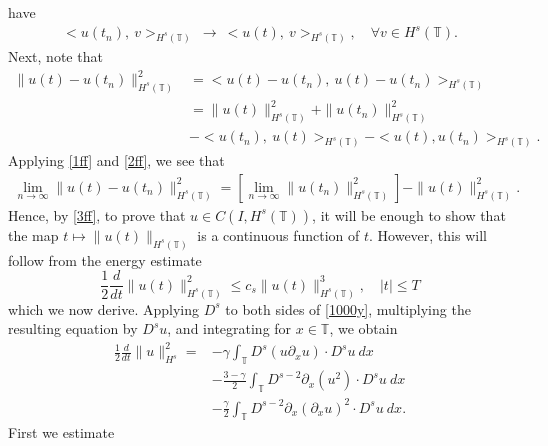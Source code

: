 \documentclass[12pt,reqno]{amsart}
\newcommand{\p}{\partial}
\newcommand{\ci}{\mathbb{T}}
\theoremstyle{plain}  %
\theoremstyle{definition}
\begin{document}
\begin{appendices}
have
\begin{equation}
	\begin{split}
		<u(t_n), \ v>_{H^s(\ci)} \ \longrightarrow \
		<u(t), \ v>_{H^s(\ci)}, \quad \forall
		v \in H^s(\ci).
		\label{1ff}
	\end{split}
\end{equation}
Next, note that
\begin{equation}
	\begin{split}
		\|u(t) - u(t_n) \|_{H^s(\ci)}^2
		& = <u(t) - u(t_n), \ u(t) -
		u(t_n)>_{H^s(\ci)}
		\\
		& = \|u(t)\|_{H^s(\ci)}^2 + \|u(t_n)\|_{H^s(\ci)}^2
		\\
		& - <u(t_n), \
		u(t) >_{H^s(\ci)} - <u(t), u(t_n)>_{H^s(\ci)}.
		\label{2ff}
	\end{split}
\end{equation}
Applying \eqref{1ff} and \eqref{2ff}, we see that
\begin{equation}
	\begin{split}
		\lim_{n \to \infty} \|u(t) - u(t_n)\|_{H^s(\ci)}^2 = \left[ \lim_{n
		\to \infty} \|u(t_n)\|_{H^s(\ci)}^2
		\right] - \|u(t)\|_{H^s(\ci)}^2.
		\label{3ff}
	\end{split}
\end{equation}
Hence, by \eqref{3ff}, to prove that $u \in C(I, H^s(\ci))$, it will be
enough to show that the map $t \mapsto \|u(t)\|_{H^s(\ci)}$ is a continuous
function of $t$. However, this will follow from the energy
estimate
		\begin{equation}
			\label{en-est-u}
			\frac{1}{2} \frac{d}{dt} \|u(t)\|_{H^s(\ci)}^2
			\le c_s \|u(t)\|_{H^s(\ci)}^3, \quad |t| \le T
		\end{equation}
		which we now derive. Applying $D^s$ to both sides of
		\eqref{1000y}, multiplying the
		resulting equation by $D^s u$, and integrating for $x\in \ci$, we obtain
		\begin{equation}
			\begin{split}
				\label{bound-int}
				\frac 12
				\frac{d}{dt} \|u \|_{H^s}^2
				=
				&-
				\gamma \int_{\ci}   D^s (u \p_x u) \cdot
				D^s u \  dx
				\\
				&- \frac{3 -\gamma}{2} \int_{\ci}  D^{s-2} \p_x (u^2) 
				\cdot D^s u \ dx
				\\
				&- \frac{\gamma}{2} \int_{\ci}   D^{s-2} \p_x (\p_x u)^2
				\cdot D^s u \ dx.
			\end{split}
		\end{equation}
		First we estimate
	\begin{equation}

\end{equation}
\end{appendices}
\end{document}
